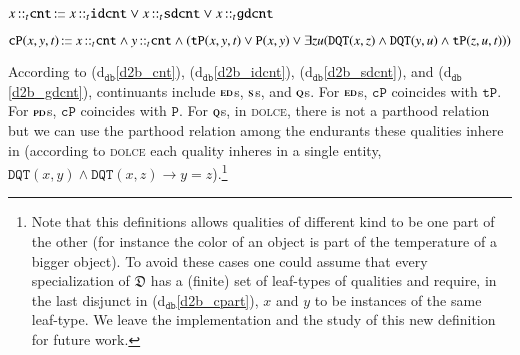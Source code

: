 \documentclass[ao]{iosart2x}
\newcommand{\dbDefLabel}{\textrm{d$_\texttt{db}$}}
\newcounter{cntdbdf}
\newcommand{\dbdf}[1]{\refstepcounter{cntdbdf}\begin{small}{\bf \dbDefLabel\thecntdbdf\label{#1}}\end{small}}
\newcommand{\refdbdf}[1]{({\dbDefLabel}\ref{#1})}
\newcommand{\pr}[1]{\mathtt{#1}}
\newcommand{\cn}[1]{\mathtt{#1}}
\newcommand\textequal{%
 \rule[.08ex]{5pt}{0.35pt}\llap{\rule[.78ex]{5pt}{0.35pt}}}
\newcommand{\sdef}{{\hspace{1.5pt}:\hspace{-2.5pt}\textequal\hspace{3pt}}}
\newcommand{\dolce}{{\textsc{dolce}}}
\newcommand {\thdolce} {\ensuremath{\mathfrak{D}}}
\newcommand {\EDdcat} {\textsc{ed}}
\newcommand {\NPEDdcat} {\textsc{nped}}
\newcommand {\PDdcat} {\textsc{pd}}
\newcommand {\Qdcat} {\textsc{q}}
\newcommand {\Sdcat} {\textsc{s}}
\newcommand {\TPd} {\ensuremath{\pr{tP}}}
\newcommand {\Pd} {\ensuremath{\pr{P}}}
\newcommand {\PREd} {\ensuremath{\pr{PRE}}}
\newcommand {\DQTd} {\ensuremath{\pr{DQT}}}
\newcommand {\EXDd} {\ensuremath{\pr{EXD}}}
\newcommand{\cntbcat}{\cn{cnt}}
\newcommand{\idcntbcat}{\cn{idcnt}}
\newcommand{\gdcntbcat}{\cn{gdcnt}}
\newcommand{\sdcntbcat}{\cn{sdcnt}}
\newcommand{\sregbcat}{\cn{sreg}}
\newcommand{\bfocpart}{\pr{cP}}
\newcommand{\bfoiof}[1]{{\,::_{#1\:\!}}}
\begin{document}
\item[\dbdf{d2b_cnt}] $x \bfoiof{t} \cntbcat \sdef x \bfoiof{t} \idcntbcat \lor x \bfoiof{t} \sdcntbcat \lor x \bfoiof{t} \gdcntbcat$

%

\item[\dbdf{d2b_cpart}] $\bfocpart(x,y,t) \sdef x \bfoiof{t} \cntbcat \land y \bfoiof{t} \cntbcat \land (\TPd(x,y,t) \lor \Pd(x,y) \lor \exists zu(\DQTd(x,z) \land \DQTd(y,u) \land \TPd(z,u,t)))$

\vspace{1pt}
According to \refdbdf{d2b_cnt}, \refdbdf{d2b_idcnt}, \refdbdf{d2b_sdcnt}, and \refdbdf{d2b_gdcnt}, continuants include $\EDdcat$s, $\Sdcat$s, and $\Qdcat$s. For $\EDdcat$s, $\bfocpart$ coincides with $\TPd$. For $\PDdcat$s, $\bfocpart$ coincides with $\Pd$. For $\Qdcat$s, in {\dolce}, there is not a parthood relation but we can use the parthood relation among the endurants these qualities inhere in (according to {\dolce} each quality inheres in a single entity,  $\DQTd(x,y) \land \DQTd(x,z) \to y=z$).\footnote{Note that this definitions allows qualities of different kind to be one part of the other (for instance the color of an object is part of the temperature of a bigger object). To avoid these cases one could assume that every specialization of $\thdolce$ has a (finite) set of leaf-types of qualities and require, in the last disjunct in \refdbdf{d2b_cpart}, $x$ and $y$ to be instances of the same leaf-type. We leave the  implementation and the study of this new definition for future work.}
\end{document}
